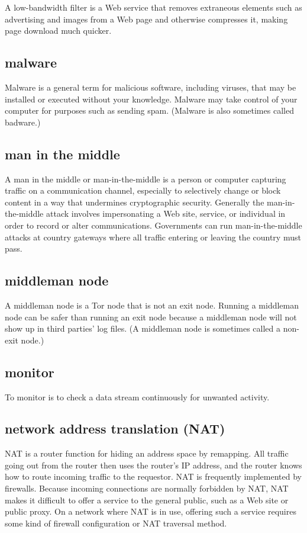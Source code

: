 A low-bandwidth filter is a Web service that removes extraneous elements
such as advertising and images from a Web page and otherwise compresses
it, making page download much quicker.

\subsection{malware}

Malware is a general term for malicious software, including viruses,
that may be installed or executed without your knowledge. Malware may
take control of your computer for purposes such as sending spam.
(Malware is also sometimes called badware.)

\subsection{man in the middle}

A man in the middle or man-in-the-middle is a person or computer
capturing traffic on a communication channel, especially to selectively
change or block content in a way that undermines cryptographic security.
Generally the man-in-the-middle attack involves impersonating a Web
site, service, or individual in order to record or alter communications.
Governments can run man-in-the-middle attacks at country gateways where
all traffic entering or leaving the country must pass.

\subsection{middleman node}

A middleman node is a Tor node that is not an exit node. Running a
middleman node can be safer than running an exit node because a
middleman node will not show up in third parties' log files. (A
middleman node is sometimes called a non-exit node.)

\subsection{monitor}

To monitor is to check a data stream continuously for unwanted activity.

\subsection{network address translation (NAT)}

NAT is a router function for hiding an address space by remapping. All
traffic going out from the router then uses the router's IP address, and
the router knows how to route incoming traffic to the requestor. NAT is
frequently implemented by firewalls. Because incoming connections are
normally forbidden by NAT, NAT makes it difficult to offer a service to
the general public, such as a Web site or public proxy. On a network
where NAT is in use, offering such a service requires some kind of
firewall configuration or NAT traversal method.

